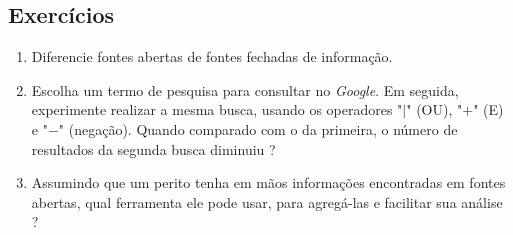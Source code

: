     \subsection{Exercícios}
    
    \begin{example} \label{cap6_exercicios}
        \begin{enumerate}
            \item Diferencie fontes abertas de fontes fechadas de informação.
            \item Escolha um termo de pesquisa para consultar no \textit{Google}. Em seguida, experimente realizar a mesma busca, usando os operadores "$|$" (OU), "$+$" (E) e "$-$" (negação). Quando comparado com o da primeira, o número de resultados da segunda busca diminuiu ?
            \item Assumindo que um perito tenha em mãos informações encontradas em fontes abertas, qual ferramenta ele pode usar, para agregá-las e facilitar sua análise ?
        \end{enumerate}
    \end{example}

\newpage